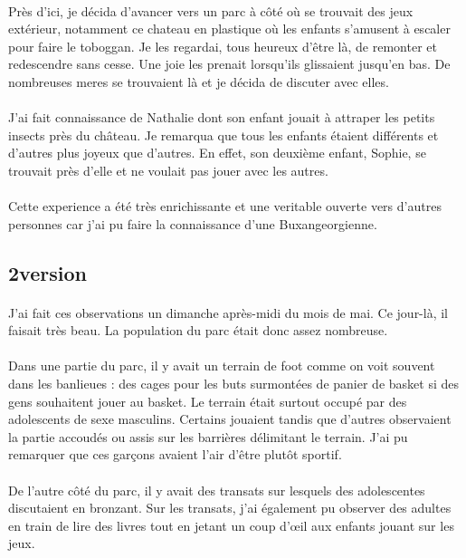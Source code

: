\paragraph{}
Près d’ici, je décida d’avancer vers un parc à côté où se
trouvait des jeux extérieur, notamment ce chateau en
plastique où les enfants s’amusent à escaler pour faire le
toboggan. Je les regardai, tous heureux d’être là, de remonter
et redescendre sans cesse. Une joie les prenait lorsqu’ils
glissaient jusqu’en bas. De nombreuses meres se trouvaient là
et je décida de discuter avec elles.
\paragraph{}
J’ai fait connaissance de Nathalie dont son enfant jouait à
attraper les petits insects près du château. Je remarqua que
tous les enfants étaient différents et d’autres plus joyeux que
d’autres. En effet, son deuxième enfant, Sophie, se trouvait
près d’elle et ne voulait pas jouer avec les autres.
\paragraph{}
Cette experience a été très enrichissante et une veritable
ouverte vers d’autres personnes car j’ai pu faire la
connaissance d’une Buxangeorgienne.

\subsection{2\ieme version}
\paragraph{}
J’ai fait ces observations un dimanche après-midi du mois de mai. Ce jour-là, il faisait très beau. La population du parc était donc assez nombreuse.
\paragraph{}
Dans une partie du parc, il y avait un terrain de foot comme on voit souvent dans les banlieues : des cages pour les buts surmontées de panier de basket si des gens souhaitent jouer au basket. Le terrain était surtout occupé par des adolescents de sexe masculins. Certains jouaient tandis que d’autres observaient la partie accoudés ou assis sur les barrières délimitant le terrain. J’ai pu remarquer que ces garçons avaient l’air d’être plutôt sportif.
\paragraph{}
De l’autre côté du parc, il y avait des transats sur lesquels des adolescentes discutaient en bronzant. Sur les transats, j’ai également pu  observer des adultes en train de lire des livres tout en jetant un coup d’œil aux enfants jouant sur les jeux. 
